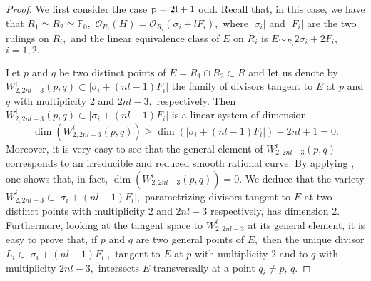 \documentclass[plain]{amsart}
\def\p{\rm{p}}
\begin{document}
\begin{proof} We first consider the case $\p=2l+1$ odd. Recall that, in this case, we have that $R_1\simeq R_2\simeq\mathbb F_0,$
$\mathcal O_{R_i}(H)=\mathcal O_{R_i}(\sigma_i+l F_i),$ where $|\sigma_i|$ and $|F_i|$
are the two rulings on $R_i,$ and the linear equivalence class of $E$ on $R_i$ is
$E\sim_{R_i}2\sigma_i+2 F_i,$ $i=1,2.$

Let $p$ and $q$ be two distinct points of $E= R_1\cap R_2\subset R$ and let us denote by
$W_{2,2nl-3}^i(p,q)\subset |\sigma_i+(nl-1)F_i|$ the family of divisors tangent to $E$ at $p$ and $q$ with
multiplicity $2$ and $2nl-3,$ respectively. Then $W_{2,2nl-3}^i(p,q)\subset |\sigma_i+(nl-1)F_i|$
 is a linear system of dimension $$\dim(W_{2,2nl-3}^i(p,q))\geq \dim(|\sigma_i+(nl-1)F_i|)-2nl+1=0.$$
Moreover, it is very easy to see that the general element of $W_{2,2nl-3}^i(p,q)$ corresponds to an irreducible and reduced 
smooth rational curve. By applying \cite[Proposition 2.1]{harris}, one shows that, in fact, $\dim(W_{2,2nl-3}^i(p,q))=0.$ We deduce that 
the variety $W_{2,2nl-3}^i\subset |\sigma_i+(nl-1)F_i|,$ parametrizing divisors tangent to $E$ at two distinct 
points with multiplicity $2$ and $2nl-3$ respectively, has dimension $2.$ Furthermore, looking at the tangent space 
to  $W_{2,2nl-3}^i$ at its general element, it is easy to prove that, if $p$ and $q$ are two general points of $E,$
then the unique divisor $L_i\in |\sigma_i+(nl-1)F_i|,$ tangent to $E$ at $p$ with multiplicity $2$ and to $q$ with multiplicity
$2nl-3,$ intersects $E$ transversally at a point $q_i\neq p,\,q.$ 


\end{proof}
\end{document}
